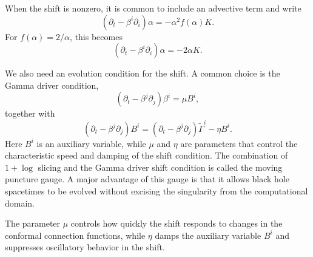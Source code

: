 When the shift is nonzero, it is common to include an advective term and write
\begin{equation}
\left(\partial_t-\beta^i\partial_i\right)\alpha
=
-\alpha^2 f(\alpha)K .
\end{equation}
For $f(\alpha)=2/\alpha$, this becomes
\begin{equation}
\left(\partial_t-\beta^i\partial_i\right)\alpha
=
-2\alpha K .
\end{equation}

We also need an evolution condition for the shift. A common choice is the Gamma driver condition,
\begin{equation}
\left(\partial_t-\beta^j\partial_j\right)\beta^i
=
\mu B^i,
\end{equation}
together with
\begin{equation}
\left(\partial_t-\beta^j\partial_j\right)B^i
=
\left(\partial_t-\beta^j\partial_j\right)\tilde{\Gamma}^i
-
\eta B^i .
\end{equation}
Here $B^i$ is an auxiliary variable, while $\mu$ and $\eta$ are parameters that control the characteristic speed and damping of the shift condition. The combination of $1+\log$ slicing and the Gamma driver shift condition is called the moving puncture gauge. A major advantage of this gauge is that it allows black hole spacetimes to be evolved without excising the singularity from the computational domain.

The parameter $\mu$ controls how quickly the shift responds to changes in the conformal connection functions, while $\eta$ damps the auxiliary variable $B^i$ and suppresses oscillatory behavior in the shift.
